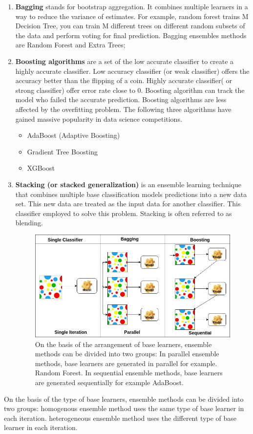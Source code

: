             \begin{enumerate}
                \item \textbf{Bagging} stands for bootstrap aggregation. It combines multiple learners in a way to reduce the variance of estimates. For example, random forest trains M Decision Tree, you can train M different trees on different random subsets of the 
                data and perform voting for final prediction. Bagging ensembles methods are Random Forest and Extra Trees;
                \item \textbf{Boosting algorithms} are a set of the low accurate classifier to create a highly accurate classifier. Low accuracy classifier (or weak classifier) offers the accuracy better than the flipping of a coin. Highly accurate classifier( or strong classifier) 
                offer error rate close to 0. Boosting algorithm can track the model who failed the accurate prediction. Boosting algorithms are less affected by the overfitting problem. The following three algorithms have gained massive popularity in data science competitions.
                    \begin{itemize}
                        \item AdaBoost (Adaptive Boosting)
                        \item Gradient Tree Boosting
                        \item XGBoost
                    \end{itemize}
                \item \textbf{Stacking (or stacked generalization)} is an ensemble learning technique that combines multiple base classification models predictions into a new data set. This new data are treated as the input data for another classifier. This classifier employed to 
                solve this problem. Stacking is often referred to as blending.
                    \begin{figure}[H]
                        \centering
                        \includegraphics[width=0.6\linewidth]{img/stacking.png}
                        \caption{On the basis of the arrangement of base learners, ensemble methods can be divided into two groups: In parallel ensemble methods, base learners are generated in parallel for example. Random Forest. In sequential ensemble methods, base learners are generated sequentially for example AdaBoost.}
                    \end{figure}
            \end{enumerate}
            On the basis of the type of base learners, ensemble methods can be divided into two groups: homogenous ensemble method uses the same type of base learner in each iteration. heterogeneous ensemble method uses the different type of base learner in each iteration.

